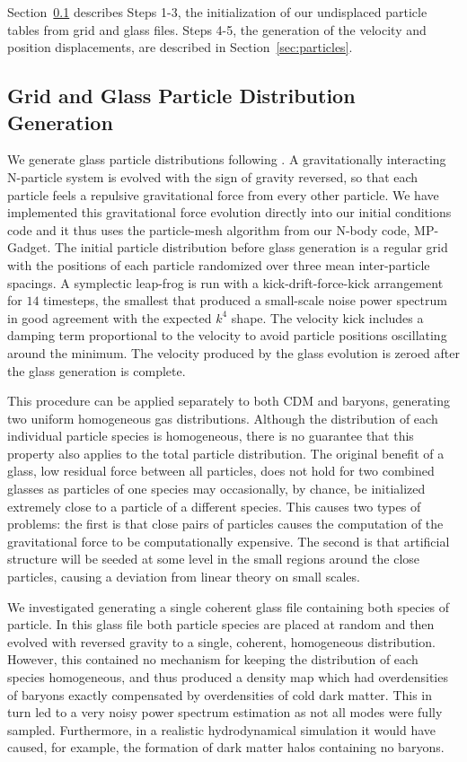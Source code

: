 \documentclass[a4paper,11pt]{article}
\begin{document}
Section~\ref{sec:glass} describes Steps 1-3, the initialization of our undisplaced particle tables from grid and glass files. Steps 4-5, the generation of the velocity and position displacements, are described in Section~\ref{sec:particles}.

\subsection{Grid and Glass Particle Distribution Generation}
\label{sec:glass}

We generate glass particle distributions following \cite{White:1994}. A gravitationally interacting N-particle system is evolved with the sign of gravity reversed, so that each particle feels a repulsive gravitational force from every other particle. We have implemented this gravitational force evolution directly into our initial conditions code and it thus uses the particle-mesh algorithm from our N-body code, MP-Gadget. The initial particle distribution before glass generation is a regular grid with the positions of each particle randomized over three mean inter-particle spacings. A symplectic leap-frog is run with a kick-drift-force-kick arrangement for $14$ timesteps, the smallest that produced a small-scale noise power spectrum in good agreement with the expected $k^4$ shape. The velocity kick includes a damping term proportional to the velocity to avoid particle positions oscillating around the minimum. The velocity produced by the glass evolution is zeroed after the glass generation is complete.

This procedure can be applied separately to both CDM and baryons, generating two uniform homogeneous gas distributions.
Although the distribution of each individual particle species is homogeneous, there is no guarantee that this property also applies to the total particle distribution. The original benefit of a glass, low residual force between all particles, does not hold for two combined glasses \cite{Yoshida:2003} as particles of one species may occasionally, by chance, be initialized extremely close to a particle of a different species. This causes two types of problems: the first is that close pairs of particles causes the computation of the gravitational force to be computationally expensive. The second is that artificial structure will be seeded at some level in the small regions around the close particles, causing a deviation from linear theory on small scales.

We investigated generating a single coherent glass file containing both species of particle. In this glass file both particle species are placed at random and then evolved with reversed gravity to a single, coherent, homogeneous distribution. However, this contained no mechanism for keeping the distribution of each species homogeneous, and thus produced a density map which had overdensities of baryons exactly compensated by overdensities of cold dark matter. This in turn led to a very noisy power spectrum estimation as not all modes were fully sampled. Furthermore, in a realistic hydrodynamical simulation it would have caused, for example, the formation of dark matter halos containing no baryons.
\end{document}
